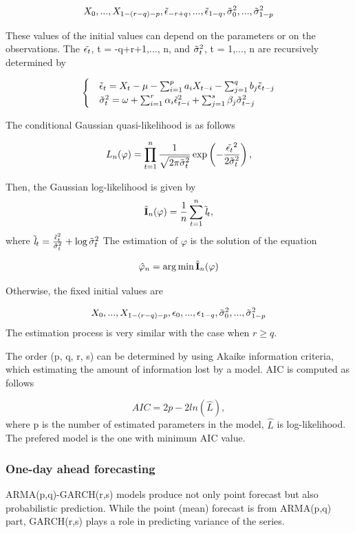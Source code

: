 \documentclass[12pt,a4paper]{article}
\numberwithin{equation}{section}
\begin{document}
\[X_0, ..., X_{1-(r-q)-p}, \Tilde{\epsilon}_{-r+q}, ..., \Tilde{\epsilon}_{1-q}, \Tilde{\sigma}_0^2, ..., \Tilde{\sigma}_{1-p}^2 \]

These values of the initial values can depend on the parameters or on the observations. The $\Tilde{\epsilon_t}$, t = -q+r+1,..., n, and $\Tilde{\sigma}^2_t$, t = 1,..., n are recursively determined by

\begin{equation}
\begin{cases}
& \Tilde{\epsilon}_t = X_t - \mu - \sum_{i=1}^{p} a_i X_{t-i}  - \sum_{j=1}^{q} b_j \Tilde{\epsilon}_{t-j}\\
& \Tilde{\sigma}_t^2 = \omega + \sum_{i=1}^{r} \alpha_i \Tilde{\epsilon}_{t-i}^2 + \sum_{j=1}^{s} \beta_j \Tilde{\sigma}_{t-j}^2\\
\end{cases}
\end{equation}

The conditional Gaussian quasi-likelihood is as follows

\[L_n(\varphi) = \prod_{t=1}^{n} \frac{1}{\sqrt{2 \pi \Tilde{\sigma}_t^2}} \exp \left (-\frac{\Tilde{\epsilon_t}^2}{2 \Tilde{\sigma}_t^2} \right ), \]

Then, the Gaussian log-likelihood is given by
\[\Tilde{\textbf{I}}_n(\varphi) = \frac{1}{n} \sum_{t=1}^{n} \Tilde{\textit{l}}_t, \]
where $\Tilde{\textit{l}}_t = \frac{\Tilde{\epsilon}_t^2}{\Tilde{\sigma}_t^2} + \log \Tilde{\sigma}_t^2$
The estimation of $\varphi$ is the solution of the equation

\[\hat{\varphi}_n = \arg\min \Tilde{\textbf{I}}_n (\varphi)\]

 Otherwise, the fixed initial values are 
 
 \[X_0, ..., X_{1-(r-q)-p}, \epsilon_{0}, ..., \epsilon_{1-q}, \Tilde{\sigma}_0^2, ..., \Tilde{\sigma}_{1-p}^2\]
 The estimation process is very similar with the case when $r \geq q$.
 
The order (p, q, r, s) can be determined by using Akaike information criteria, which estimating the amount of information lost by a model. AIC is computed as follows

\[AIC = 2p - 2ln(\hat{L}),\]
where p is the number of estimated parameters in the model, $\hat{L}$ is log-likelihood. The prefered model is the one with minimum AIC value.


 \subsubsection{One-day ahead forecasting}
 ARMA(p,q)-GARCH(r,s) models produce not only point forecast but also probabilistic prediction. While the point (mean) forecast is from ARMA(p,q) part, GARCH(r,s) plays a role in predicting variance of the series.
 
\end{document}
